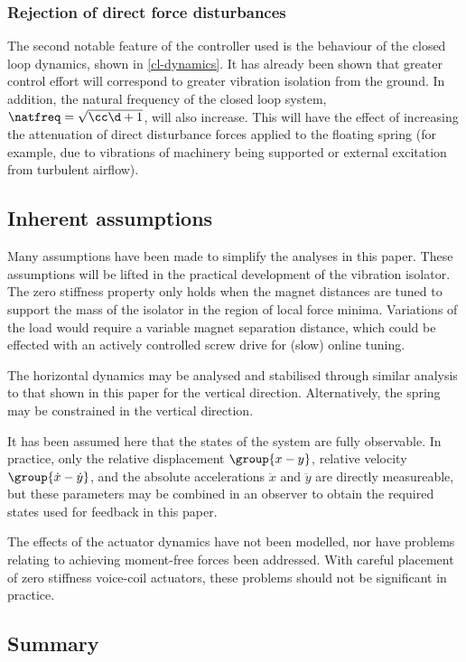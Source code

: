\subsubsection{Rejection of direct force disturbances}

The second notable feature of the controller used is the behaviour
of the closed loop dynamics, shown in \eqref{cl-dynamics}. It has
already been shown that greater control effort will correspond to
greater vibration isolation from the ground. In addition, the
natural frequency of the closed loop system, $\natfreq =
\sqrt{\cc\d+1}$, will also increase. This will have the effect of
increasing the attenuation of direct disturbance forces applied to
the floating spring (for example, due to vibrations of machinery
being supported or external excitation from turbulent airflow).

\subsection{Inherent assumptions}

Many assumptions have been made to simplify the analyses in this
paper. These assumptions will be lifted in the practical development
of the vibration isolator. The zero stiffness property only holds
when the magnet distances are tuned to support the mass of the
isolator in the region of local force minima. Variations of the load
would require a variable magnet separation distance, which could be
effected with an actively controlled screw drive for (slow) online
tuning.

The horizontal dynamics may be analysed and stabilised through
similar analysis to that shown in this paper for the vertical
direction. Alternatively, the spring may be constrained in the
vertical direction.

It has been assumed here that the states of the system are fully
observable. In practice, only the relative displacement
$\group{x-y}$, relative velocity $\group{\dot x-\dot y}$, and the
absolute accelerations $\ddot x$ and $\ddot y$ are directly
measureable, but these parameters may be combined in an observer to
obtain the required states used for feedback in this paper.

The effects of the actuator dynamics have not been modelled, nor
have problems relating to achieving moment-free forces been
addressed. With careful placement of zero stiffness voice-coil
actuators, these problems should not be significant in practice.

\subsection{Summary}

